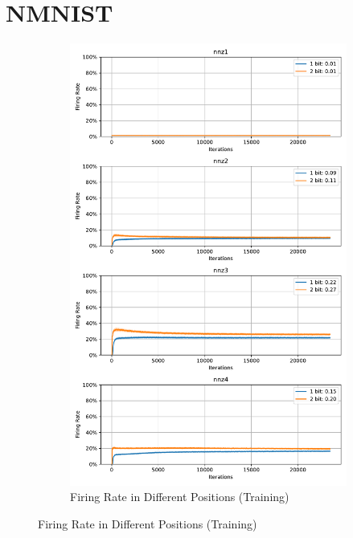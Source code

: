     \section{NMNIST}
    \label{appendix:firerate_nmnist}
        \begin{figure}[H]
            \centering
            \begin{subfigure}[H]{0.8\textwidth}
                \centering
                \includegraphics[width=\textwidth]{../firerate/NMNIST/plots/nmnist_train_firerate.pdf}
                \caption{Firing Rate in Different Positions (Training)}
            \end{subfigure}
        \end{figure}
